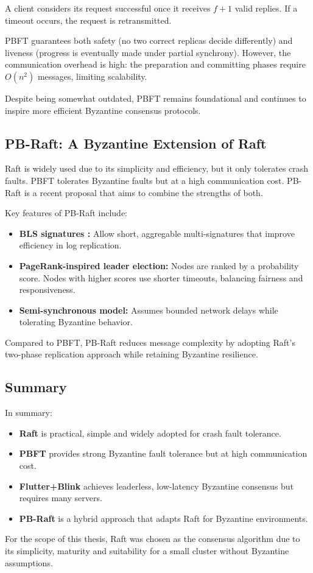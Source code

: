 A client considers its request successful once it receives $f+1$ valid replies. If a timeout occurs, the request is retransmitted.  

PBFT guarantees both safety (no two correct replicas decide differently) and liveness (progress is eventually made under partial synchrony). However, the communication overhead is high: the preparation and committing phases require $O(n^2)$ messages, limiting scalability.  

Despite being somewhat outdated, PBFT remains foundational and continues to inspire more efficient Byzantine consensus protocols.

\subsection{PB-Raft: A Byzantine Extension of Raft}

Raft is widely used due to its simplicity and efficiency, but it only tolerates crash faults. PBFT tolerates Byzantine faults but at a high communication cost.  
PB-Raft \cite{shi2025pb} is a recent proposal that aims to combine the strengths of both.

Key features of PB-Raft include:
\begin{itemize}
    \item \textbf{BLS signatures \cite{boneh2001short}:} Allow short, aggregable multi-signatures that improve efficiency in log replication.
    \item \textbf{PageRank-inspired leader election:} Nodes are ranked by a probability score. Nodes with higher scores use shorter timeouts, balancing fairness and responsiveness.
    \item \textbf{Semi-synchronous model:} Assumes bounded network delays while tolerating Byzantine behavior.
\end{itemize}

Compared to PBFT, PB-Raft reduces message complexity by adopting Raft's two-phase replication approach while retaining Byzantine resilience.  

\subsection{Summary}

In summary:
\begin{itemize}
    \item \textbf{Raft} is practical, simple and widely adopted for crash fault tolerance.
    \item \textbf{PBFT} provides strong Byzantine fault tolerance but at high communication cost.
    \item \textbf{Flutter+Blink} achieves leaderless, low-latency Byzantine consensus but requires many servers.
    \item \textbf{PB-Raft} is a hybrid approach that adapts Raft for Byzantine environments.
\end{itemize}

For the scope of this thesis, Raft was chosen as the consensus algorithm due to its simplicity, maturity and suitability for a small cluster without Byzantine assumptions.

